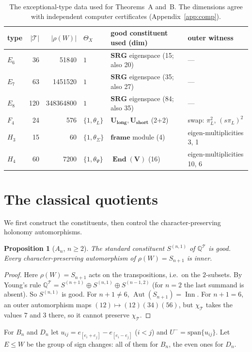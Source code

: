 \documentclass[11pt]{article}
\newtheorem{proposition}[theorem]{Proposition}
\theoremstyle{definition}
\newcommand{\Q}{\mathbb{Q}}
\newcommand{\T}{\mathcal{T}}
\newcommand{\Aut}{\operatorname{Aut}}
\newcommand{\Inn}{\operatorname{Inn}}
\newcommand{\End}{\operatorname{End}}
\begin{document}
\begin{table}[ht]\centering\small
\begin{tabular}{lrrlll}
\toprule
type & $|\T|$ & $|\rho(W)|$ & $\Theta_X$ & good constituent used (dim) & outer witness\\
\midrule
$E_6$ & 36 & 51840 & $1$ & $\mathbf{SRG}$ eigenspace (15; also 20) & ---\\
$E_7$ & 63 & 1451520 & $1$ & $\mathbf{SRG}$ eigenspace (35; also 27) & ---\\
$E_8$ & 120 & 348364800 & $1$ & $\mathbf{SRG}$ eigenspace (84; also 35) & ---\\
$F_4$ & 24 & 576 & $\{1,\theta_L\}$ & $\mathbf{U_{long}},\mathbf{U_{short}}$ (2+2) & swap: $\pi_L^2$, $(s\pi_L)^2$\\
$H_3$ & 15 & 60 & $\{1,\theta_\Sigma\}$ & $\mathbf{frame}$ module (4) & eigen-multiplicities 3, 1\\
$H_4$ & 60 & 7200 & $\{1,\theta_\Psi\}$ & $\mathbf{\End(V)}$ (16) & eigen-multiplicities 10, 6\\
\bottomrule
\end{tabular}
\caption{The exceptional-type data used for Theorems~A and~B. The dimensions agree with independent computer certificates
(Appendix~\ref{app:comp}).}
\end{table}

\section{The classical quotients}\label{sec:classical}

We first construct the constituents, then control the character-preserving holonomy automorphisms.

\begin{proposition}[$A_n$, $n\ge2$]\label{prop:An}
The standard constituent $S^{(n,1)}$ of $\Q^\T$ is good. Every character-preserving automorphism
of $\rho(W)=S_{n+1}$ is inner.
\end{proposition}
\begin{proof}
Here $\rho(W)=S_{n+1}$ acts on the transpositions, i.e.\ on the $2$-subsets. By Young's rule
$\Q^\T=S^{(n+1)}\oplus S^{(n,1)}\oplus S^{(n-1,2)}$ (for $n=2$ the last summand is absent). So $S^{(n,1)}$ is good.
For $n+1\ne6$, $\Aut(S_{n+1})=\Inn$. For $n+1=6$, an outer automorphism maps $(12)\mapsto(12)(34)(56)$, but
$\chi_\T$ takes the values $7$ and $3$ there, so it cannot preserve $\chi_\T$.
\end{proof}

For $B_n$ and $D_n$ let $u_{ij}=e_{[e_i+e_j]}-e_{[e_i-e_j]}$ ($i<j$) and $U^-=\mathrm{span}\{u_{ij}\}$. Let $E\le W$
be the group of sign changes: all of them for $B_n$, the even ones for $D_n$.
\end{document}
